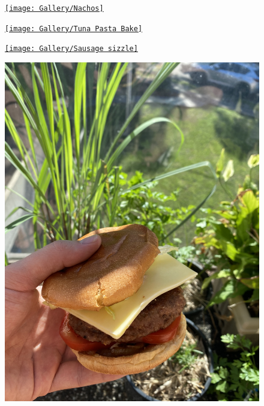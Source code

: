 \documentclass[]{article}
\begin{document}
\newpage\begin{figure}[H]
\begin{center}\hyperref[rec:Nachos]{\texttt{[image: Gallery/Nachos]}}\caption*{}\label{fig:Nachos}\end{center}
\end{figure}
\newpage\begin{figure}[H]
\begin{center}\hyperref[rec:Tuna Pasta Bake]{\texttt{[image: Gallery/Tuna Pasta Bake]}}\caption*{}\label{fig:Tuna Pasta Bake}\end{center}
\end{figure}
\newpage\begin{figure}[H]
\begin{center}\hyperref[rec:Sausage sizzle]{\texttt{[image: Gallery/Sausage sizzle]}}\caption*{}\label{fig:Sausage sizzle}\end{center}
\end{figure}
\newpage\begin{figure}[H]
\begin{center}\hyperref[rec:Beef Burgers]{\includegraphics[keepaspectratio,width=\textheight,height=\textwidth,angle=-90]{Gallery/Beef Burgers}}\caption*{}\label{fig:Beef Burgers}\end{center}
\end{figure}
\end{document}
